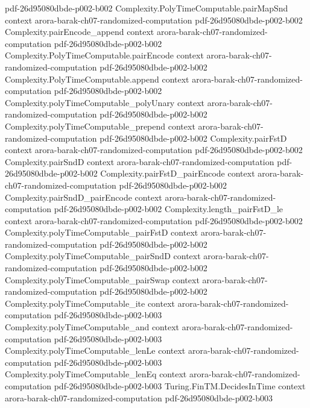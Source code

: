 \begin{theorem}
  {pdf-26d95080dbde-p002-b002}
\proofstep
  {Complexity.PolyTimeComputable.pairMapSnd}
  {context}
  {arora-barak-ch07-randomized-computation}
  {pdf-26d95080dbde-p002-b002}
\proofstep
  {Complexity.pairEncode_append}
  {context}
  {arora-barak-ch07-randomized-computation}
  {pdf-26d95080dbde-p002-b002}
\proofstep
  {Complexity.PolyTimeComputable.pairEncode}
  {context}
  {arora-barak-ch07-randomized-computation}
  {pdf-26d95080dbde-p002-b002}
\proofstep
  {Complexity.PolyTimeComputable.append}
  {context}
  {arora-barak-ch07-randomized-computation}
  {pdf-26d95080dbde-p002-b002}
\proofstep
  {Complexity.polyTimeComputable_polyUnary}
  {context}
  {arora-barak-ch07-randomized-computation}
  {pdf-26d95080dbde-p002-b002}
\proofstep
  {Complexity.polyTimeComputable_prepend}
  {context}
  {arora-barak-ch07-randomized-computation}
  {pdf-26d95080dbde-p002-b002}
\proofstep
  {Complexity.pairFstD}
  {context}
  {arora-barak-ch07-randomized-computation}
  {pdf-26d95080dbde-p002-b002}
\proofstep
  {Complexity.pairSndD}
  {context}
  {arora-barak-ch07-randomized-computation}
  {pdf-26d95080dbde-p002-b002}
\proofstep
  {Complexity.pairFstD_pairEncode}
  {context}
  {arora-barak-ch07-randomized-computation}
  {pdf-26d95080dbde-p002-b002}
\proofstep
  {Complexity.pairSndD_pairEncode}
  {context}
  {arora-barak-ch07-randomized-computation}
  {pdf-26d95080dbde-p002-b002}
\proofstep
  {Complexity.length_pairFstD_le}
  {context}
  {arora-barak-ch07-randomized-computation}
  {pdf-26d95080dbde-p002-b002}
\proofstep
  {Complexity.polyTimeComputable_pairFstD}
  {context}
  {arora-barak-ch07-randomized-computation}
  {pdf-26d95080dbde-p002-b002}
\proofstep
  {Complexity.polyTimeComputable_pairSndD}
  {context}
  {arora-barak-ch07-randomized-computation}
  {pdf-26d95080dbde-p002-b002}
\proofstep
  {Complexity.polyTimeComputable_pairSwap}
  {context}
  {arora-barak-ch07-randomized-computation}
  {pdf-26d95080dbde-p002-b002}
\proofstep
  {Complexity.polyTimeComputable_ite}
  {context}
  {arora-barak-ch07-randomized-computation}
  {pdf-26d95080dbde-p002-b003}
\proofstep
  {Complexity.polyTimeComputable_and}
  {context}
  {arora-barak-ch07-randomized-computation}
  {pdf-26d95080dbde-p002-b003}
\proofstep
  {Complexity.polyTimeComputable_lenLe}
  {context}
  {arora-barak-ch07-randomized-computation}
  {pdf-26d95080dbde-p002-b003}
\proofstep
  {Complexity.polyTimeComputable_lenEq}
  {context}
  {arora-barak-ch07-randomized-computation}
  {pdf-26d95080dbde-p002-b003}
\proofstep
  {Turing.FinTM.DecidesInTime}
  {context}
  {arora-barak-ch07-randomized-computation}
  {pdf-26d95080dbde-p002-b003}

\end{theorem}
